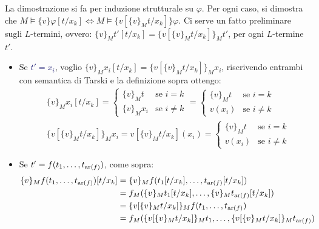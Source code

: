 \begin{soln}
    La dimostrazione si fa per induzione strutturale su $\varphi$. Per ogni caso, si dimostra che $M \models\{v\} \varphi[t/x_k] \iff M \models\{v[\{v\}_M t/x_k]\} \varphi$.
    Ci serve un fatto preliminare sugli $L$-termini, ovvero: $\{v\}_M t'[t/x_k] = \{v[\{v\}_M t/x_k]\}_M t'$, per ogni $L$-termine $t'$.
    \begin{itemize}
        \item Se \textcolor{MidnightBlue}{$t' = x_i$}, voglio $\{v\}_M x_i[t/x_k] = \{v[\{v\}_M t/x_k]\}_M x_i$, riscrivendo entrambi con semantica di Tarski e la definizione sopra ottengo:
            \begin{align*}
                & \{v\}_M x_i[t/x_k] = \begin{cases}
                    \{v\}_M t &\text{se $i = k$} \\
                    \{v\}_M x_i &\text{se $i \neq k$}
                \end{cases}
                =
                \begin{cases}
                    \{v\}_M t &\text{se $i = k$} \\
                    v(x_i) &\text{se $i \neq k$}
                \end{cases}
                \\
                & \{v[\{v\}_M t/x_k]\}_M x_i = v[\{v\}_M t/x_k](x_i) = \begin{cases}
                    \{v\}_M t &\text{se $i = k$} \\
                    v(x_i) &\text{se $i \neq k$}
                \end{cases}
            \end{align*}
        \item Se \textcolor{MidnightBlue}{$t' = f(t_1,\ldots,t_{\operatorname{ar}(f)})$}, come sopra:
            \begin{align*}
                \{v\}_M f(t_1,\ldots,t_{\operatorname{ar}(f)})[t/x_k] &= \{v\}_M f(t_1[t/x_k],\ldots,t_{\operatorname{ar}(f)}[t/x_k]) \\
                                                 &= f_M(\{v\}_M t_1[t/x_k],\ldots,\{v\}_M t_{\operatorname{ar}(f)}[t/x_k]) \\
                                                 &= \{v[\{v\}_M t/x_k]\}_M f(t_1,\ldots,t_{\operatorname{ar}(f)}) \\
                                                 &= f_M(\{v[\{v\}_M t/x_k]\}_M t_1,\ldots,\{v[\{v\}_M t/x_k]\}_M t_{\operatorname{ar}(f)})
            \end{align*}

\end{itemize}
\end{soln}
